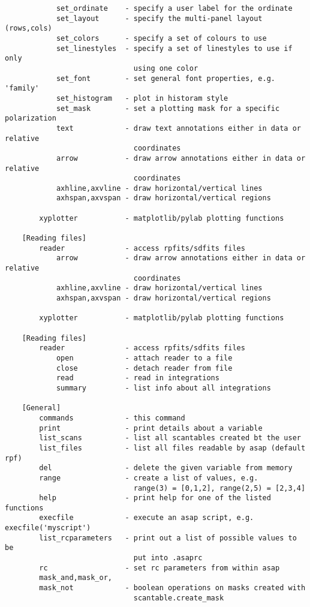 \documentclass[11pt]{article}
\begin{document}
\begin{verbatim}
            set_ordinate    - specify a user label for the ordinate
            set_layout      - specify the multi-panel layout (rows,cols)
            set_colors      - specify a set of colours to use
            set_linestyles  - specify a set of linestyles to use if only
                              using one color
            set_font        - set general font properties, e.g. 'family'
            set_histogram   - plot in historam style
            set_mask        - set a plotting mask for a specific polarization
            text            - draw text annotations either in data or relative
                              coordinates
            arrow           - draw arrow annotations either in data or relative
                              coordinates
            axhline,axvline - draw horizontal/vertical lines
            axhspan,axvspan - draw horizontal/vertical regions

        xyplotter           - matplotlib/pylab plotting functions

    [Reading files]
        reader              - access rpfits/sdfits files
            arrow           - draw arrow annotations either in data or relative
                              coordinates
            axhline,axvline - draw horizontal/vertical lines
            axhspan,axvspan - draw horizontal/vertical regions

        xyplotter           - matplotlib/pylab plotting functions

    [Reading files]
        reader              - access rpfits/sdfits files
            open            - attach reader to a file
            close           - detach reader from file
            read            - read in integrations
            summary         - list info about all integrations

    [General]
        commands            - this command
        print               - print details about a variable
        list_scans          - list all scantables created bt the user
        list_files          - list all files readable by asap (default rpf)
        del                 - delete the given variable from memory
        range               - create a list of values, e.g.
                              range(3) = [0,1,2], range(2,5) = [2,3,4]
        help                - print help for one of the listed functions
        execfile            - execute an asap script, e.g. execfile('myscript')
        list_rcparameters   - print out a list of possible values to be
                              put into .asaprc
        rc                  - set rc parameters from within asap
        mask_and,mask_or,
        mask_not            - boolean operations on masks created with
                              scantable.create_mask
\end{verbatim}
\end{document}
